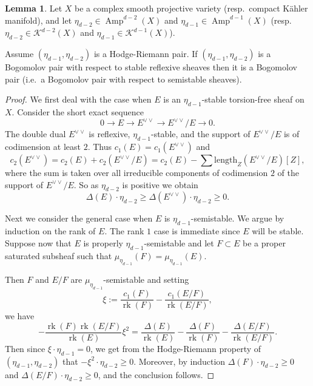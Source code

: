 \documentclass[a4,reqno]{amsart}
\theoremstyle{definition}
\newtheorem{lemma}[theorem]{Lemma}
\def\cK{\mathcal K}
\DeclareMathOperator{\Amp}{Amp}
\DeclareMathOperator{\rk}{rk}
\numberwithin{equation}{section}
\begin{document}
\begin{lemma}\label{lem:reflexivestable}
Let $X$ be a complex smooth projective variety (resp.\ compact K\"ahler manifold), and let $\eta_{d-2}\in \Amp^{d-2}(X)$ and $\eta_{d-1}\in \Amp^{d-1}(X)$ (resp.\ $\eta_{d-2}\in \cK^{d-2}(X)$ and $\eta_{d-1}\in \cK^{d-1}(X)$).


Assume $(\eta_{d-1},\eta_{d-2})$ is a Hodge-Riemann pair.  If $(\eta_{d-1},\eta_{d-2})$ is a Bogomolov pair with respect to stable reflexive sheaves then it is a Bogomolov pair (i.e.\ a Bogomolov pair with respect to semistable sheaves).
\end{lemma}
\begin{proof}
We first deal with the case when $E$ is an $\eta_{d-1}$-stable torsion-free sheaf on $X$. Consider the short exact sequence
\[
    0 \to E \to E^{\vee \vee} \to E^{\vee \vee}/E \to 0.
\]
The double dual $E^{\vee \vee}$ is reflexive, $\eta_{d-1}$-stable, and the support of $E^{\vee \vee}/E$ is of codimension at least $2$. Thus $c_1(E)=c_1(E^{\vee \vee})$ and $$c_2(E^{\vee \vee}) = c_2(E) + c_2(E^{\vee \vee}/E) = c_2(E) - \sum\text{length}_Z(E^{\vee \vee}/E)[Z],$$  
where the sum is taken over all irreducible components of codimension $2$ of the support of $E^{\vee \vee}/E$. So as $\eta_{d-2}$ is positive we obtain
\[
    \Delta(E) \cdot \eta_{d-2}\ge \Delta(E^{\vee \vee}) \cdot \eta_{d-2} \ge 0.
\]

Next we consider the general case when $E$ is $\eta_{d-1}$-semistable. We argue by induction on the rank of $E$. The rank $1$ case is immediate since $E$ will be stable. Suppose now that $E$ is properly $\eta_{d-1}$-semistable and let $F \subset E$ be a proper saturated subsheaf such that $\mu_{\eta_{d-1}}(F) =\mu_{\eta_{d-1}}(E)$.

Then $F$ and $E/F$ are $\mu_{\eta_{d-1}}$-semistable and setting
$$\xi := \frac{c_1(F)}{\rk(F)} - \frac{c_1(E/F)}{\rk(E/F)},$$
we have
\begin{equation}\label{eq:bogomolovexact}
    -\frac{\rk(F)\rk(E/F)}{\rk(E)}\xi^2 = \frac{\Delta(E)}{\rk(E)} - \frac{\Delta(F)}{\rk(F)} - \frac{\Delta(E/F)}{\rk(E/F)}.
\end{equation}
Then since $\xi \cdot \eta_{d-1} = 0$, we get from the Hodge-Riemann property of $(\eta_{d-1},\eta_{d-2})$ that  $-\xi^2 \cdot \eta_{d-2} \ge 0$.   Moreover, by induction $\Delta(F) \cdot \eta_{d-2} \ge 0$ and $\Delta(E/F) \cdot \eta_{d-2} \ge 0$, and the conclusion follows. 
\end{proof}
\end{document}
